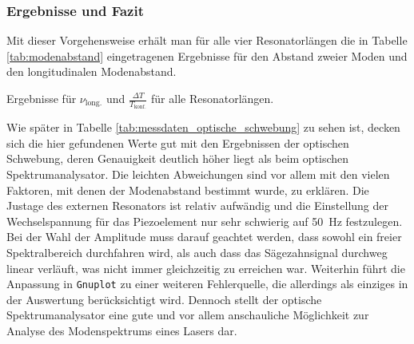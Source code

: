 \documentclass[11pt, a4paper]{article}
\numberwithin{equation}{section}
\begin{document}
\subsubsection{Ergebnisse und Fazit}

Mit dieser Vorgehensweise erhält man für alle vier Resonatorlängen die in Tabelle \ref{tab:modenabstand} eingetragenen Ergebnisse für den Abstand zweier Moden und den longitudinalen Modenabstand.
\begin{table}[htb]
\centering

\label{tab:modenabstand}
\caption{Ergebnisse für $\nu_\text{long.}$ und $\frac{\Delta T}{T_\text{konf.}}$ für alle Resonatorlängen.}
\end{table}
Wie später in Tabelle \ref{tab:messdaten_optische_schwebung} zu sehen ist, decken sich die hier gefundenen Werte gut mit den Ergebnissen der optischen Schwebung, deren Genauigkeit deutlich höher liegt als beim optischen Spektrumanalysator.
Die leichten Abweichungen sind vor allem mit den vielen Faktoren, mit denen der Modenabstand bestimmt wurde, zu erklären.
Die Justage des externen Resonators ist relativ aufwändig und die Einstellung der Wechselspannung für das Piezoelement nur sehr schwierig auf \SI{50}{\hertz} festzulegen.
Bei der Wahl der Amplitude muss darauf geachtet werden, dass sowohl ein freier Spektralbereich durchfahren wird, als auch dass das Sägezahnsignal durchweg linear verläuft, was nicht immer gleichzeitig zu erreichen war.
Weiterhin führt die Anpassung in \texttt{Gnuplot} zu einer weiteren Fehlerquelle, die allerdings als einziges in der Auswertung berücksichtigt wird.
Dennoch stellt der optische Spektrumanalysator eine gute und vor allem anschauliche Möglichkeit zur Analyse des Modenspektrums eines Lasers dar.
\end{document}
